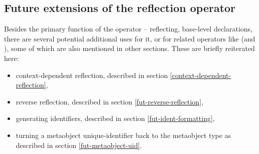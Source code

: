 \subsection{Future extensions of the reflection operator}
\label{fut-reflexpr}

Besides the primary function of the \verb@reflexpr@ operator -- reflecting,
base-level declarations, there are several potential additional uses for it,
or for related operators like (\verb@unreflexpr@ and \verb@idreflexpr@),
some of which are also mentioned in other sections. These are briefly reiterated
here:

\begin{itemize}
\item context-dependent reflection, described in section
	\ref{context-dependent-reflection},
\item reverse reflection, described in section \ref{fut-reverse-reflection},
\item generating identifiers, described in section \ref{fut-ident-formatting},
\item turning a \verb@constexpr@ metaobject unique-identifier back
	to the metaobject type as described in section \ref{fut-metaobject-uid}.
\end{itemize}


